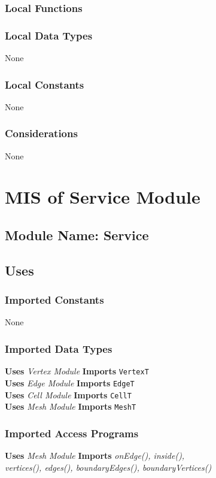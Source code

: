 \documentclass[12pt,titlepage]{article}
\begin{document}
\subsubsection{Local Functions} 
\subsubsection{Local Data Types} None
\subsubsection{Local Constants} None
\subsubsection{Considerations} None

\section{MIS of Service Module \label{AmisSecSer}}

\subsection{Module Name: Service}

\subsection{Uses}
\subsubsection{Imported Constants} None
\subsubsection{Imported Data Types} 
{\bf Uses}  \emph{Vertex Module}  {\bf Imports}  \texttt{VertexT}  \\
{\bf Uses}  \emph{Edge Module}  {\bf Imports}  \texttt{EdgeT}  \\
{\bf Uses}  \emph{Cell Module}  {\bf Imports}  \texttt{CellT}  \\
{\bf Uses}  \emph{Mesh Module}  {\bf Imports}  \texttt{MeshT}  

\subsubsection{Imported Access Programs}
{\bf Uses}  \emph{Mesh Module}  {\bf Imports} 
\emph{onEdge(), inside(), \\vertices(), edges(), boundaryEdges(), boundaryVertices()}  
\end{document}
